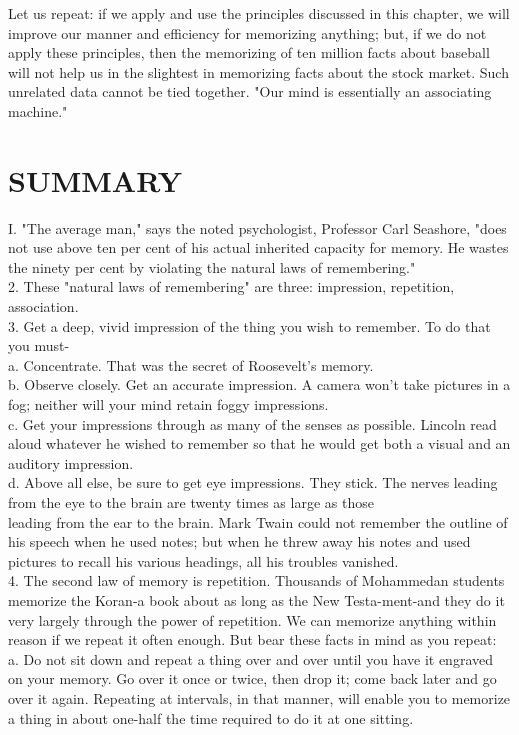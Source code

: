 \documentclass[10pt]{article}
\begin{document}
Let us repeat: if we apply and use the principles discussed in this chapter, we will improve our manner and efficiency for memorizing anything; but, if we do not apply these principles, then the memorizing of ten million facts about baseball will not help us in the slightest in memorizing facts about the stock market. Such unrelated data cannot be tied together. "Our mind is essentially an associating machine."

\section*{SUMMARY}
I. "The average man," says the noted psychologist, Professor Carl Seashore, "does not use above ten per cent of his actual inherited capacity for memory. He wastes the ninety per cent by violating the natural laws of remembering."\\
2. These "natural laws of remembering" are three: impression, repetition, association.\\
3. Get a deep, vivid impression of the thing you wish to remember. To do that you must-\\
a. Concentrate. That was the secret of Roosevelt's memory.\\
b. Observe closely. Get an accurate impression. A camera won't take pictures in a fog; neither will your mind retain foggy impressions.\\
c. Get your impressions through as many of the senses as possible. Lincoln read aloud whatever he wished to remember so that he would get both a visual and an auditory impression.\\
d. Above all else, be sure to get eye impressions. They stick. The nerves leading from the eye to the brain are twenty times as large as those\\
leading from the ear to the brain. Mark Twain could not remember the outline of his speech when he used notes; but when he threw away his notes and used pictures to recall his various headings, all his troubles vanished.\\
4. The second law of memory is repetition. Thousands of Mohammedan students memorize the Koran-a book about as long as the New Testa-ment-and they do it very largely through the power of repetition. We can memorize anything within reason if we repeat it often enough. But bear these facts in mind as you repeat:\\
a. Do not sit down and repeat a thing over and over until you have it engraved on your memory. Go over it once or twice, then drop it; come back later and go over it again. Repeating at intervals, in that manner, will enable you to memorize a thing in about one-half the time required to do it at one sitting.\\
\end{document}
